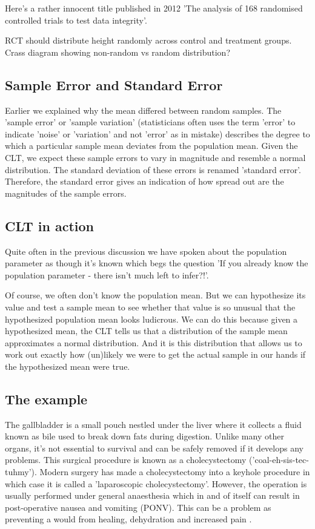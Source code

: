\documentclass[a4paper,twosided,notoc]{tufte-book}
\begin{document}
Here's a rather innocent title published in 2012 'The analysis of 168 randomised controlled trials to test data integrity'. 

RCT should distribute height randomly across control and treatment groups. Crass diagram showing non-random vs random distribution?

\subsection{Sample Error and Standard Error}

Earlier we explained why the mean differed between random samples. The 'sample error' or 'sample variation' (statisticians often uses the term 'error' to indicate 'noise' or 'variation' and not 'error' as in mistake) describes the degree to which a particular sample mean deviates from the population mean. Given the CLT, we expect these sample errors to vary in magnitude and resemble a normal distribution. The standard deviation of these errors is renamed 'standard error'. Therefore, the standard error gives an indication of how spread out are the magnitudes of the sample errors.

\subsection{CLT in action}
Quite often in the previous discussion we have spoken about the population parameter as though it's known which begs the question 'If you already know the population parameter - there isn't much left to infer?!'. 

Of course, we often don't know the population mean. But we can hypothesize its value and test a sample mean to see whether that value is so unusual that the hypothesized population mean looks ludicrous. We can do this because given a hypothesized mean, the CLT tells us that a distribution of the sample mean approximates a normal distribution. And it is this distribution that allows us to work out exactly how (un)likely we were to get the actual sample in our hands if the hypothesized mean were true. 

\subsection{The example}
The gallbladder is a small pouch nestled under the liver where it collects a fluid known as bile used to break down fats during digestion. Unlike many other organs, it's not essential to survival and can be safely removed if it develops any problems. This surgical procedure is known as a cholecystectomy ('coal-eh-sis-tec-tuhmy'). Modern surgery has made a cholecystectomy into a keyhole procedure in which case it is called a 'laparoscopic cholecystectomy'. However, the operation is usually performed under general anaesthesia which in and of itself can result in post-operative nausea and vomiting (PONV). This can be a problem as preventing a would from healing, dehydration and increased pain .
\end{document}
